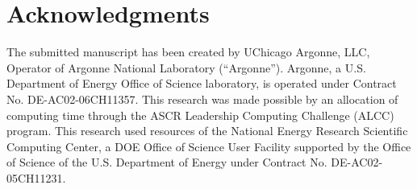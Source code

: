 \section*{Acknowledgments}

The submitted manuscript has been created by UChicago Argonne, LLC,
Operator of Argonne National Laboratory (``Argonne'').
Argonne, a U.S. Department of Energy Office of Science laboratory,
is operated under Contract No. DE-AC02-06CH11357.
This research was made possible by an allocation of computing time through the ASCR Leadership Computing Challenge (ALCC) program. This research used resources of the National Energy Research Scientific Computing Center, a DOE Office of Science User Facility supported by the Office of Science of the U.S. Department of Energy under Contract No. DE-AC02-05CH11231.



